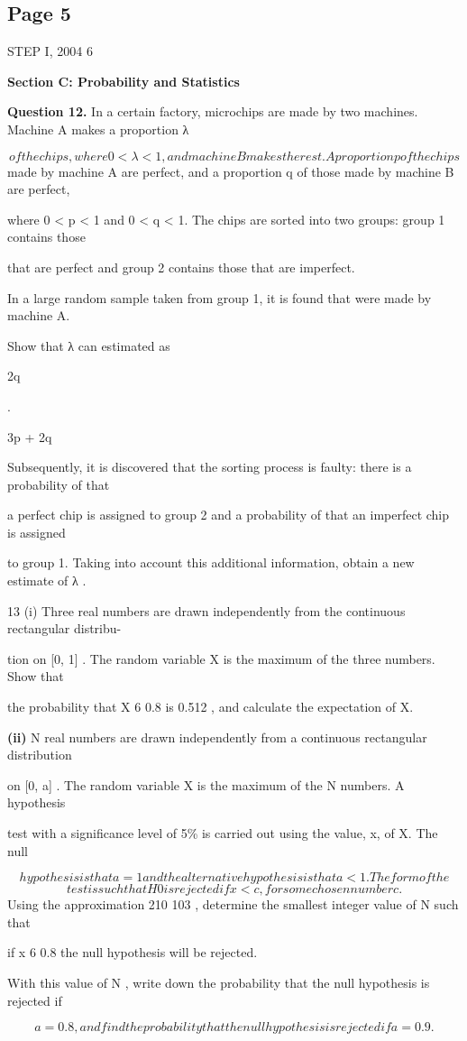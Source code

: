 \documentclass[12pt]{article}
\begin{document}
\subsection*{Page 5}
\begin{flushleft}
STEP I, 2004 6\par
\bigskip\textbf{Section C: Probability and Statistics}\par
\bigskip\textbf{Question 12.} In a certain factory, microchips are made by two machines. Machine A makes a proportion λ\par
\[of the chips, where 0 < λ < 1, and machine B makes the rest. A proportion p of the chips\]
made by machine A are perfect, and a proportion q of those made by machine B are perfect,\par
where 0 < p < 1 and 0 < q < 1. The chips are sorted into two groups: group 1 contains those\par
that are perfect and group 2 contains those that are imperfect.\par
In a large random sample taken from group 1, it is found that were made by machine A.\par
Show that λ can estimated as\par
2q\par
.\par
3p + 2q\par
Subsequently, it is discovered that the sorting process is faulty: there is a probability of that\par
a perfect chip is assigned to group 2 and a probability of that an imperfect chip is assigned\par
to group 1. Taking into account this additional information, obtain a new estimate of λ .\par
13 (i) Three real numbers are drawn independently from the continuous rectangular distribu-\par
tion on [0, 1] . The random variable X is the maximum of the three numbers. Show that\par
the probability that X 6 0.8 is 0.512 , and calculate the expectation of X.\par
\textbf{(ii)} N real numbers are drawn independently from a continuous rectangular distribution\par
on [0, a] . The random variable X is the maximum of the N numbers. A hypothesis\par
test with a significance level of 5\% is carried out using the value, x, of X. The null\par
\[hypothesis is that a = 1 and the alternative hypothesis is that a < 1 . The form of the\]
\[test is such that H 0 is rejected if x < c , for some chosen number c .\]
Using the approximation 210 103 , determine the smallest integer value of N such that\par
\approx\par
if x 6 0.8 the null hypothesis will be rejected.\par
With this value of N , write down the probability that the null hypothesis is rejected if\par
\[a = 0.8 , and find the probability that the null hypothesis is rejected if a = 0.9 .\]
\end{flushleft}
\end{document}
